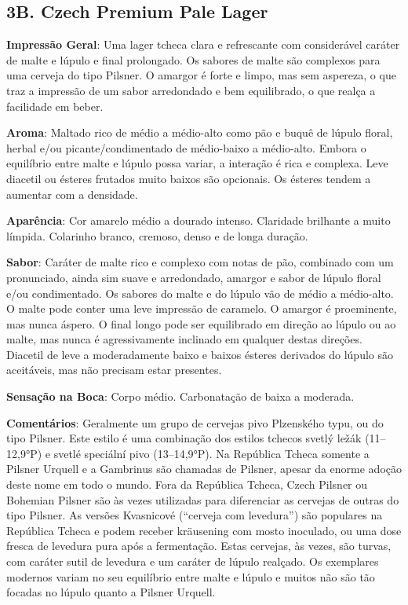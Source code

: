 \subsection*{3B. Czech Premium Pale Lager}

\textbf{Impressão Geral}: Uma lager tcheca clara e refrescante com considerável caráter de malte e lúpulo e final prolongado. Os sabores de malte são complexos para uma cerveja do tipo Pilsner. O amargor é forte e limpo, mas sem aspereza, o que traz a impressão de um sabor arredondado e bem equilibrado, o que realça a facilidade em beber.

\textbf{Aroma}: Maltado rico de médio a médio-alto como pão e buquê de lúpulo floral, herbal e/ou picante/condimentado de médio-baixo a médio-alto. Embora o equilíbrio entre malte e lúpulo possa variar, a interação é rica e complexa. Leve diacetil ou ésteres frutados muito baixos são opcionais. Os ésteres tendem a aumentar com a densidade.

\textbf{Aparência}: Cor amarelo médio a dourado intenso. Claridade brilhante a muito límpida. Colarinho branco, cremoso, denso e de longa duração.

\textbf{Sabor}: Caráter de malte rico e complexo com notas de pão, combinado com um pronunciado, ainda sim suave e arredondado, amargor e sabor de lúpulo floral e/ou condimentado. Os sabores do malte e do lúpulo vão de médio a médio-alto. O malte pode conter uma leve impressão de caramelo. O amargor é proeminente, mas nunca áspero. O final longo pode ser equilibrado em direção ao lúpulo ou ao malte, mas nunca é agressivamente inclinado em qualquer destas direções. Diacetil de leve a moderadamente baixo e baixos ésteres derivados do lúpulo são aceitáveis, mas não precisam estar presentes.

\textbf{Sensação na Boca}: Corpo médio. Carbonatação de baixa a moderada.

\textbf{Comentários}: Geralmente um grupo de cervejas pivo Plzenského typu, ou do tipo Pilsner. Este estilo é uma combinação dos estilos tchecos svetlý ležák (11–12,9°P) e svetlé speciální pivo (13–14,9°P). Na República Tcheca somente a Pilsner Urquell e a Gambrinus são chamadas de Pilsner, apesar da enorme adoção deste nome em todo o mundo. Fora da República Tcheca, Czech Pilsner ou Bohemian Pilsner são às vezes utilizadas para diferenciar as cervejas de outras do tipo Pilsner. As versões Kvasnicové (“cerveja com levedura”) são populares na República Tcheca e podem receber kräusening com mosto inoculado, ou uma dose fresca de levedura pura após a fermentação. Estas cervejas, às vezes, são turvas, com caráter sutil de levedura e um caráter de lúpulo realçado. Os exemplares modernos variam no seu equilíbrio entre malte e lúpulo e muitos não são tão focadas no lúpulo quanto a Pilsner Urquell.

